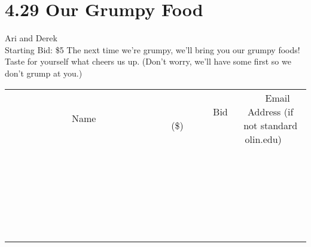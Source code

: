 \documentclass[11pt]{article}
\begin{document}
\section*{4.29 Our Grumpy Food}
Ari and Derek
\\
Starting Bid: \$5
\newline
The next time we're grumpy, we'll bring you our grumpy foods! Taste for yourself what cheers us up. (Don't worry, we'll have some first so we don't grump at you.)
\\[6ex]
\begin{tabular}{c c c}
~~~~~~~~~~~~~Name~~~~~~~~~~~~~ & ~~~~~~~~~Bid (\$)~~~~~~~~~  & ~~~Email Address (if not standard olin.edu)~~~\\
 & & \\
\hline
 & & \\
\hline
 & & \\
\hline
 & & \\
\hline
 & & \\
\hline
 & & \\
\hline
 & & \\
\hline
 & & \\
\hline
 & & \\
\hline
 & & \\
\hline
 & & \\
\hline
 & & \\
\hline
 & & \\
\hline
 & & \\
\hline
 & & \\
\hline
 & & \\
\hline
 & & \\
\hline
 & & \\
\hline
 & & \\
\hline
 & & \\
\hline
 & & \\
\hline
 & & \\
\hline
 & & \\
\hline
 & & \\
\hline
 & & \\
\hline
 & & \\
\hline
\end{tabular}
\newpage
\end{document}
